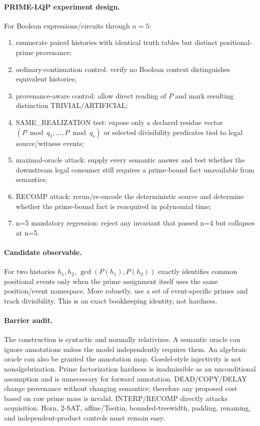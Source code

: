 \documentclass[11pt]{article}
\begin{document}
\paragraph{PRIME-LQP experiment design.}
For Boolean expressions/circuits through $n=5$:
\begin{enumerate}
\item enumerate paired histories with identical truth tables but distinct positional-prime provenance;
\item ordinary-continuation control: verify no Boolean context distinguishes equivalent histories;
\item provenance-aware control: allow direct reading of $P$ and mark resulting distinction TRIVIAL/ARTIFICIAL;
\item SAME\_REALIZATION test: expose only a declared residue vector $(P\bmod q_1,\ldots,P\bmod q_s)$ or selected divisibility predicates tied to legal source/witness events;
\item maximal-oracle attack: supply every semantic answer and test whether the downstream legal consumer still requires a prime-bound fact unavailable from semantics;
\item RECOMP attack: rerun/re-encode the deterministic source and determine whether the prime-bound fact is reacquired in polynomial time;
\item n=5 mandatory regression: reject any invariant that passed n=4 but collapses at n=5.
\end{enumerate}

\paragraph{Candidate observable.}
For two histories $h_1,h_2$, $\gcd(P(h_1),P(h_2))$ exactly identifies common positional events only when the prime assignment itself uses the same position/event namespace. More robustly, use a set of event-specific primes and track divisibility. This is an exact bookkeeping identity, not hardness.

\paragraph{Barrier audit.}
The construction is syntactic and normally relativizes. A semantic oracle can ignore annotations unless the model independently requires them. An algebraic oracle can also be granted the annotation map. Goedel-style injectivity is not nonalgebrization. Prime factorization hardness is inadmissible as an unconditional assumption and is unnecessary for forward annotation. DEAD/COPY/DELAY change provenance without changing semantics; therefore any proposed cost based on raw prime mass is invalid. INTERP/RECOMP directly attacks acquisition. Horn, 2-SAT, affine/Tseitin, bounded-treewidth, padding, renaming, and independent-product controls must remain easy.
\end{document}
